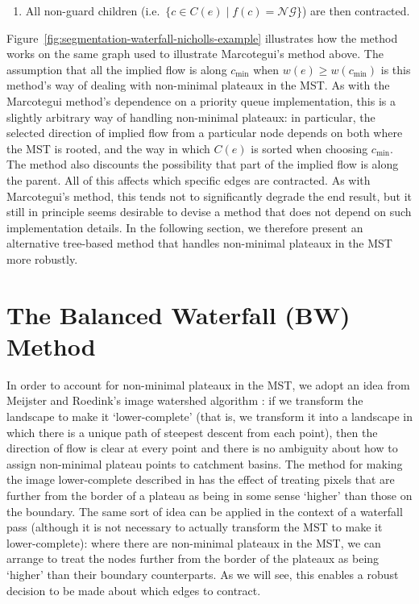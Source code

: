 \documentclass[preprint,a4paper]{elsarticle}
\begin{document}
\begin{enumerate}
\begin{enumerate}
\item All non-guard children (i.e.~$\{c \in C(e) \; | \; f(c) = \mathcal{NG}\}$) are then contracted.

\end{enumerate}

\end{enumerate}
%
Figure~\ref{fig:segmentation-waterfall-nicholls-example} illustrates how the method works on the same graph used to illustrate Marcotegui's method above. The assumption that all the implied flow is along $c_{\min}$ when $w(e) \ge w(c_{\min})$ is this method's way of dealing with non-minimal plateaux in the MST. As with the Marcotegui method's dependence on a priority queue implementation, this is a slightly arbitrary way of handling non-minimal plateaux: in particular, the selected direction of implied flow from a particular node depends on both where the MST is rooted, and the way in which $C(e)$ is sorted when choosing $c_{\min}$. The method also discounts the possibility that part of the implied flow is along the parent. All of this affects which specific edges are contracted. As with Marcotegui's method, this tends not to significantly degrade the end result, but it still in principle seems desirable to devise a method that does not depend on such implementation details. In the following section, we therefore present an alternative tree-based method that handles non-minimal plateaux in the MST more robustly.

\section{The Balanced Waterfall (BW) Method}
\label{sec:golodetz}

In order to account for non-minimal plateaux in the MST, we adopt an idea from Meijster and Roedink's image watershed algorithm \cite{meijster98}: if we transform the landscape to make it `lower-complete' (that is, we transform it into a landscape in which there is a unique path of steepest descent from each point), then the direction of flow is clear at every point and there is no ambiguity about how to assign non-minimal plateau points to catchment basins. The method for making the image lower-complete described in \cite{meijster98} has the effect of treating pixels that are further from the border of a plateau as being in some sense `higher' than those on the boundary. The same sort of idea can be applied in the context of a waterfall pass (although it is not necessary to actually transform the MST to make it lower-complete): where there are non-minimal plateaux in the MST, we can arrange to treat the nodes further from the border of the plateaux as being `higher' than their boundary counterparts. As we will see, this enables a robust decision to be made about which edges to contract.
\end{document}
